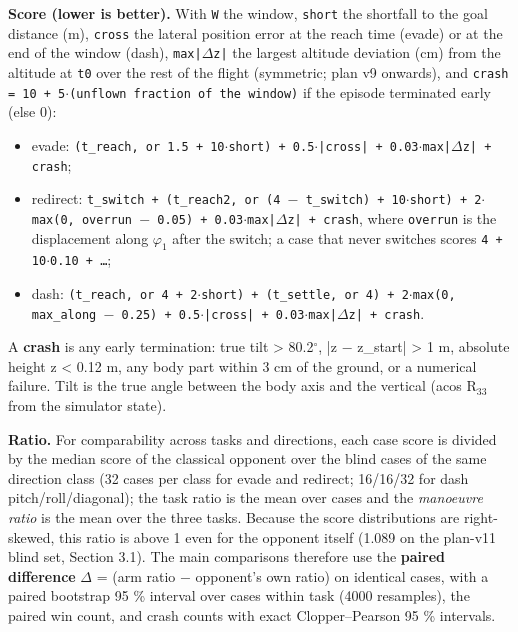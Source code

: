 \documentclass[10pt,a4paper]{article}
\begin{document}
\textbf{Score (lower is better).} With \texttt{W} the window, \texttt{short} the shortfall to the goal distance (m), \texttt{cross} the lateral position error at the reach time (evade) or at the end of the window (dash), \texttt{max|$\Delta$z|} the largest altitude deviation (cm) from the altitude at \texttt{t0} over the rest of the flight (symmetric; plan v9 onwards), and \texttt{crash = 10 + 5$\cdot$(unflown fraction of the window)} if the episode terminated early (else 0):

\begin{itemize}\setlength\itemsep{2pt}
\item evade: \texttt{(t\_reach, or 1.5 + 10$\cdot$short) + 0.5$\cdot$|cross| + 0.03$\cdot$max|$\Delta$z| + crash};
\item redirect: \texttt{t\_switch + (t\_reach2, or (4 $-$ t\_switch) + 10$\cdot$short) + 2$\cdot$max(0, overrun $-$ 0.05) + 0.03$\cdot$max|$\Delta$z| + crash}, where \texttt{overrun} is the displacement along $\varphi_1$ after the switch; a case that never switches scores \texttt{4 + 10$\cdot$0.10 + \ldots{}};
\item dash: \texttt{(t\_reach, or 4 + 2$\cdot$short) + (t\_settle, or 4) + 2$\cdot$max(0, max\_along $-$ 0.25) + 0.5$\cdot$|cross| + 0.03$\cdot$max|$\Delta$z| + crash}.
\end{itemize}

A \textbf{crash} is any early termination: true tilt > 80.2$^\circ$, |z $-$ z\_start| > 1 m, absolute height z < 0.12 m, any body part within 3 cm of the ground, or a numerical failure. Tilt is the true angle between the body axis and the vertical (acos R$_{33}$ from the simulator state).

\textbf{Ratio.} For comparability across tasks and directions, each case score is divided by the median score of the classical opponent over the blind cases of the same direction class (32 cases per class for evade and redirect; 16/16/32 for dash pitch/roll/diagonal); the task ratio is the mean over cases and the \emph{manoeuvre ratio} is the mean over the three tasks. Because the score distributions are right-skewed, this ratio is above 1 even for the opponent itself (1.089 on the plan-v11 blind set, Section 3.1). The main comparisons therefore use the \textbf{paired difference} $\Delta$ = (arm ratio $-$ opponent's own ratio) on identical cases, with a paired bootstrap 95 \% interval over cases within task (4000 resamples), the paired win count, and crash counts with exact Clopper--Pearson 95 \% intervals.
\end{document}
